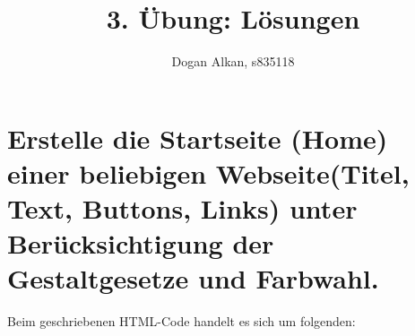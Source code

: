 \documentclass[a4paper,%
twoside,							%
headsepline=true,				%
footsepline=true,				%
headings=normal,
listof=totoc,					%
bibliography=totoc,			%
listof=entryprefix,
]
{scrartcl}
\begin{document}
\renewcommand*{\thesection}{\arabic{section}}
\renewcommand*{\thesubsection}{\alph{subsection}}
\renewcommand*{\thesubsubsection}{\arabic{subsubsection}}





\subject{\noindent\hrulefill\\ Multimediale Informationsverarbeitung}
\title{3. Übung: Lösungen}
\author{Dogan Alkan, s835118}
\date{\noindent\hrulefill}	\noindent						%
\maketitle 						%


\tableofcontents			%

\section{Erstelle die Startseite (Home) einer beliebigen Webseite(Titel, Text, Buttons, Links) unter Berücksichtigung der Gestaltgesetze und Farbwahl.}
\label{sec:AufgabeEins}
Beim geschriebenen HTML-Code handelt es sich um folgenden:
\end{document}
